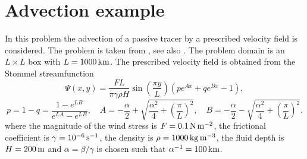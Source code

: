 % 


\section{Advection example}
\label{sect:advection}

In this problem the advection of a passive tracer by a prescribed velocity field is considered.
The problem is taken from \cite{hanert2004}, see also \cite{hecht2000}. The problem domain
is an $L\times L$ box with $L=\km[1000]$. The prescribed velocity field is obtained from the
Stommel streamfunction
\begin{equation*}
\Psi(x,y) = \frac{FL}{\pi \gamma \rho H}\sin\left(\frac{\pi y}{L}\right)\left(p e^{Ax} + q e^{Bx}-1\right),
\end{equation*}
\begin{equation*}
p = 1-q = \frac{1-e^{LB}}{e^{LA}-e^{LB}},\quad
A=-\frac{\alpha}{2}+\sqrt{\frac{\alpha^2}{4}+\left(\frac{\pi}{L}\right)^2},\quad
B=-\frac{\alpha}{2}-\sqrt{\frac{\alpha^2}{4}+\left(\frac{\pi}{L}\right)^2}.
\end{equation*}
where the magnitude of the wind stress is $F = \Nmm[0.1]$, the frictional
coefficient is $\gamma = \invs[10^{-6}]$, the density is $\rho = \kgmmm[1000]$, the
fluid depth is $H=\m[200]$ and $\alpha = \beta/\gamma$ is chosen such that $\alpha^{-1}=\km[100]$.

